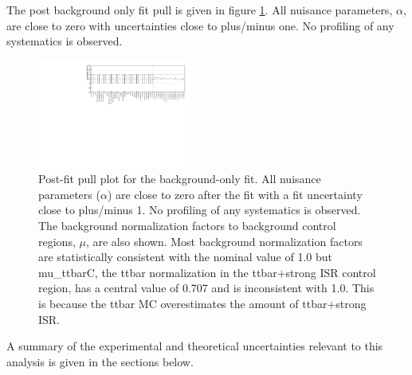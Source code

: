 
%


\indent The post background only fit pull is given in figure \ref{figure.pullPlot}.  All nuisance parameters, $\alpha$, are close to zero with uncertainties close to plus/minus one.  No profiling of any systematics is observed. \\

\begin{figure}[htbp]
	\begin{center}
		\includegraphics[width=0.45\textwidth, angle=180]{HistFitterStuff/pullPlot.pdf}
		\caption[Post-fit pull plot for the background-only fit]{Post-fit pull plot for the background-only fit.  All nuisance parameters ($\alpha$) are close to zero after the fit with a fit uncertainty close to plus/minus 1.  No profiling of any systematics is observed.  The background normalization factors to background control regions, $\mu$, are also shown.  Most background normalization factors are statistically consistent with the nominal value of 1.0 but mu\_ttbarC, the ttbar normalization in the ttbar+strong ISR control region, has a central value of 0.707 and is inconsistent with 1.0.  This is because the ttbar MC overestimates the amount of ttbar+strong ISR.   }
		\label{figure.pullPlot}
	\end{center}
\end{figure}

\indent A summary of the experimental and theoretical uncertainties relevant to this analysis is given in the sections below. \\




